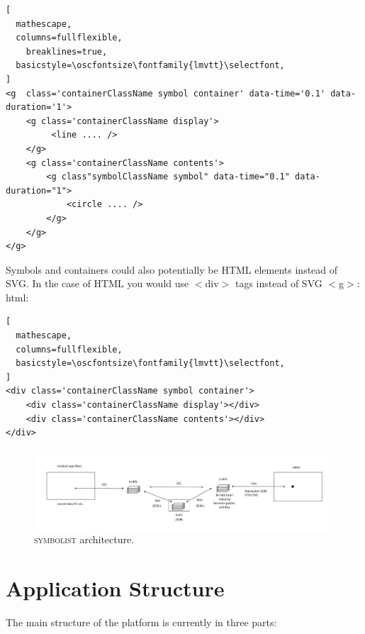 \documentclass{article}
\def\symbolist{\textsc{symbolist}\xspace}
\def\oscfontsize{\footnotesize}
\begin{document}
\begin{lstlisting}[
  mathescape,
  columns=fullflexible,
    breaklines=true,
  basicstyle=\oscfontsize\fontfamily{lmvtt}\selectfont,
]
<g  class='containerClassName symbol container' data-time='0.1' data-duration='1'>
    <g class='containerClassName display'>
         <line .... />
    </g>
    <g class='containerClassName contents'>
        <g class"symbolClassName symbol" data-time="0.1" data-duration="1">
            <circle .... />
        </g>
    </g>
</g>
\end{lstlisting}


Symbols and containers could also potentially be HTML elements instead of SVG. In the case of HTML you would use $<$div$>$ tags instead of SVG $<$g$>$:
html:

\begin{lstlisting}[
  mathescape,
  columns=fullflexible,
  basicstyle=\oscfontsize\fontfamily{lmvtt}\selectfont,
]
<div class='containerClassName symbol container'>
    <div class='containerClassName display'></div>
    <div class='containerClassName contents'></div>
</div>
\end{lstlisting}




\begin{figure}[ht!]
\centering
\includegraphics[width=2\columnwidth]{symbolist-architecture.pdf}
\caption{ \symbolist architecture.
\label{fig:architecture}}
\end{figure}



\section{Application Structure}\label{subsec:application_structure}

The main structure of the platform is currently in three parts:
\end{document}
